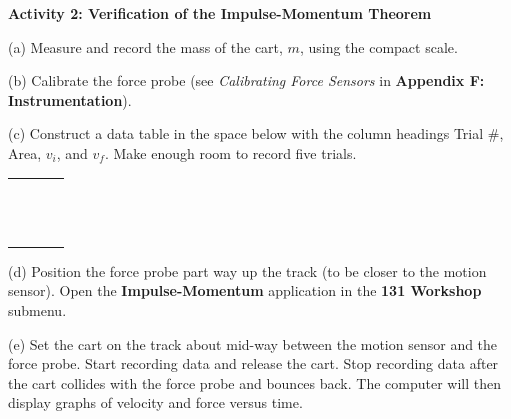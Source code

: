 \vspace{0.3cm}
{\par\centering {} \par}
\vspace{0.3cm}

\textbf{Activity  2: Verification of the Impulse-Momentum Theorem} 

(a) Measure and record the mass of the cart, $m$, using the compact scale.
\vspace{10mm}

(b) Calibrate the force probe (see \textit{Calibrating Force Sensors} in \textbf{Appendix F: Instrumentation}). 

(c) Construct a data table in the space below with the column headings Trial
\#, Area, \( v_{i} \), and \( v_{f} \). Make enough room to record five trials.

\begin{center}
\begin{tabular}{|p{1.0in}|p{1.0in}|p{1.0in}|p{1.0in}|} \hline
 & & & \\ \hline
 & & & \\
 & & & \\
 & & & \\
 & & & \\
 & & & \\
 & & & \\
 & & & \\
 & & & \\
 & & & \\
 & & & \\
 & & & \\
 & & & \\
 & & & \\ \hline
\end{tabular}
\end{center}

(d) Position the force probe part way up the track (to be closer to the motion sensor). Open the \textbf{Impulse-Momentum} application in the \textbf{131 Workshop} submenu. 

(e) Set the cart on the track about mid-way between the motion sensor and the force probe. Start recording data and release the cart. Stop recording data after the cart collides with the force probe and bounces back. The computer will then display graphs of velocity and force versus time.

